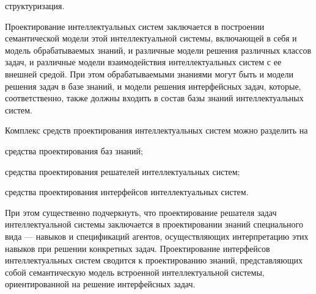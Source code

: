 \begin{SCn}
{\begin{scnitemize}
\item структуризация.
\end{scnitemize}

Проектирование интеллектуальных систем заключается в построении семантической модели этой интеллектуальной системы, включающей в себя и модель обрабатываемых знаний, и различные модели решения различных классов задач, и различные модели взаимодействия интеллектуальных систем с ее внешней средой. При этом обрабатываемыми знаниями могут быть и модели решения задач в базе знаний, и модели решения интерфейсных задач, которые, соответственно, также должны входить в состав базы знаний интеллектуальных систем.

Комплекс средств проектирования интеллектуальных систем можно разделить на

\begin{scnitemize}
    \item средства проектирования баз знаний;
    \item средства проектирования решателей интеллектуальных систем;
    \item средства проектирования интерфейсов интеллектуальных систем.
\end{scnitemize}

При этом существенно подчеркнуть, что проектирование решателя задач интеллектуальной системы заключается в проектировании знаний специального вида — навыков и спецификаций агентов, осуществляющих интерпретацию этих навыков при решении конкретных задач. Проектирование интерфейсов интеллектуальных систем сводится к проектированию знаний, представляющих собой семантическую модель встроенной интеллектуальной системы, ориентированной на решение интерфейсных задач.

}
\end{SCn}
